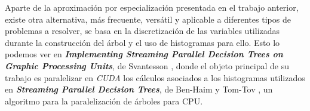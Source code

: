 \documentclass[a4paper,oneside,11pt,titlepage]{book}
\begin{document}
Aparte de la aproximación por especialización presentada en el trabajo anterior, existe otra alternativa, más frecuente, versátil y aplicable a diferentes tipos de problemas a resolver, se basa en la discretización de las variables utilizadas durante la construcción del árbol y el uso de histogramas para ello. Esto lo podemos ver en \textbf{\textit{Implementing Streaming Parallel Decision Trees on Graphic Processing Units}}, de Svantesson \cite{svatensson}, donde el objeto principal de su trabajo es paralelizar en \textit{CUDA} los cálculos asociados a los histogramas utilizados en \textbf{\textit{Streaming Parallel Decision Trees}}, de Ben-Haim y Tom-Tov \cite{spdt}, un algoritmo para la paralelización de árboles para CPU.\\



%
%
%
%
%
%
%
%
%
%
%
%
%
%
%
%
%
%
%
%
%
% 
 
%

%
%
%

\thispagestyle{empty}
\end{document}
